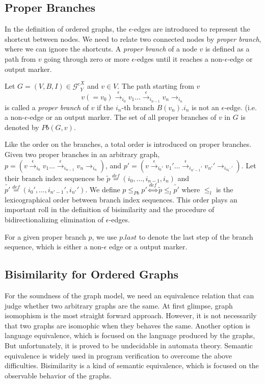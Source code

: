 \documentclass{llncs}
\newcommand{\act}[1]{{\xrightarrow{#1}{}}}
\newcommand{\Gc}{{\mathcal{G}^{c}}}
\begin{document}
\subsection{Proper Branches}\label{subsec:proper-b}

In the definition of ordered graphs, the $\epsilon$-edges are introduced to represent the shortcut between nodes. We need to relate two connected nodes by \emph{proper branch}, where we can ignore the shortcuts. A \emph{proper branch} of a node $v$ is defined as a path from $v$ going through zero or more $\epsilon$-edges until it reaches a non-$\epsilon$-edge or output marker.


Let $G=(V,B,I)\in\Gc^X_Y$ and $v\in V$. The path starting from $v$
$$v(=v_0)\act{\epsilon}_{i_0}v_1\ldots\act{\epsilon}_{i_{n-1}}v_n\act{}_{i_n}$$
is called a \emph{proper branch} of $v$ if the $i_n$-th branch $B(v_n).i_n$ is not an $\epsilon$-edge. (i.e. a non-$\epsilon$-edge or an output marker. The set of all proper branches of $v$ in $G$ is denoted by $Pb(G,v)$. 

Like the order on the branches, a total order is introduced on proper branches. Given two proper branches in an arbitrary graph, $p=(v\act{\epsilon}_{i_0}v_1\ldots\act{\epsilon}_{i_{n-1}}v_n\act{}_{i_n})$, and $p'=(v\act{\epsilon}_{i_0'}v_1'\ldots\act{\epsilon}_{i_{n'-1}'}v_{n'}'\act{}_{i_{n¡¯}'})$. Let their branch index sequences be $\tilde{p}\stackrel{def}{=}(i_0,\ldots,i_{n-1},i_n)$ and $\tilde{p'}\stackrel{def}{=}(i_0',\ldots,i_{n'-1}',i_{n'}')$. We define $p\leq_{Pb}p' \stackrel{def}{\Longleftrightarrow}\tilde{p}\leq_l\tilde{p'}$ where $\leq_l$ is the lexicographical order between branch index sequences. This order plays an important roll in the definition of bisimilarity and the procedure of bidirectionalizing elimination of $\epsilon$-edges.

For a given proper branch $p$, we use $p.last$ to denote the last step of the branch sequence, which is either a non-$\epsilon$ edge or a output marker.

\subsection{Bisimilarity for Ordered Graphs}\label{subsec:bis}

For the soundness of the graph model, we need an equivalence relation that can judge whether two arbitrary graphs are the same. At first glimpse, graph isomophism is the most straight forward approach. However, it is not necessarily that two graphs are isomophic when they behaves the same. Another option is language equivalence, which is focused on the language produced by the graphs, But unfortunately, it is proved to be undecidable in automata theory. Semantic equivalence is widely used in program verification to overcome the above difficulties. Bisimilarity is a kind of semantic equivalence, which is focused on the observable behavior of the graphs. 
\end{document}
